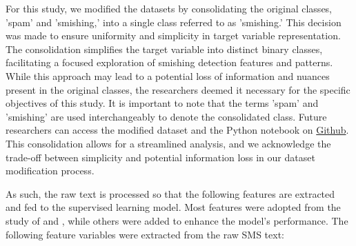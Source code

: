 \documentclass[conference]{IEEEtran}
\begin{document}
For this study, we modified the \cite{mishra2022} datasets by consolidating the original classes, 'spam' and 'smishing,' into a single class referred to as 'smishing.' This decision was made to ensure uniformity and simplicity in target variable representation. The consolidation simplifies the target variable into distinct binary classes, facilitating a focused exploration of smishing detection features and patterns. While this approach may lead to a potential loss of information and nuances present in the original classes, the researchers deemed it necessary for the specific objectives of this study. It is important to note that the terms 'spam' and 'smishing' are used interchangeably to denote the consolidated class. Future researchers can access the modified dataset and the Python notebook on \href{https://github.com/bxavace/modesim_paper/tree/main}{Github}. This consolidation allows for a streamlined analysis, and we acknowledge the trade-off between simplicity and potential information loss in our dataset modification process.

As such, the raw text is processed so that the following features are extracted and fed to the supervised learning model. Most features were adopted from the study of \cite{mishra2022} and \cite{manyumwa2020}, while others were added to enhance the model's performance. The following feature variables were extracted from the raw SMS text: 
\end{document}
